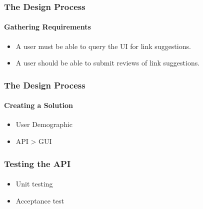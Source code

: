 \begin{frame}
    \frametitle{The Design Process}
    \framesubtitle{Gathering Requirements}
    \begin{itemize}
    	\item A user must be able to query the UI for link suggestions.
    	\item A user should be able to submit reviews of link suggestions.
    \end{itemize}
\end{frame}

\begin{frame}
    \frametitle{The Design Process}
    \framesubtitle{Creating a Solution}
    \begin{itemize}
    	\item User Demographic
    	\item API > GUI
    \end{itemize}
\end{frame}


\begin{frame}
    \frametitle{Testing the API}
    \framesubtitle{}
    \begin{itemize}
    	\item Unit testing
    	\item Acceptance test
    \end{itemize}
\end{frame}

